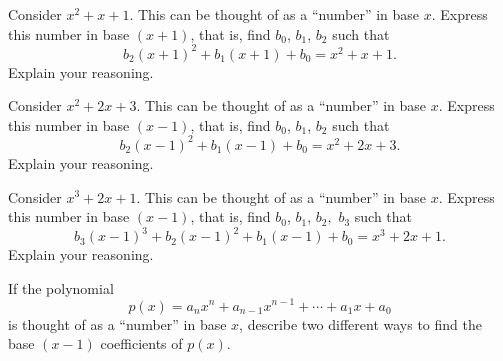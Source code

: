 \documentclass[nooutcomes]{ximera}
\begin{document}
\begin{problem}Consider $x^2 + x + 1$. This can be thought of as a ``number'' in
  base $x$. Express this number in base $(x+1)$, that is, find $b_0$, $b_1$, $b_2$ such that 
\[
b_2(x+1)^2 +b_1(x+1) + b_0 = x^2 + x + 1.
\]
Explain your reasoning.
\end{problem} 

\begin{problem}Consider $x^2 + 2x + 3$. This can be thought of as a ``number'' in
  base $x$. Express this number in base $(x-1)$, that is, find $b_0$, $b_1$, $b_2$ such that 
\[
b_2(x-1)^2 +b_1(x-1) + b_0 = x^2 + 2x + 3.
\]
Explain your reasoning.
\end{problem} 

\begin{problem}Consider $x^3 + 2x + 1$. This can be thought of as a ``number'' in
  base $x$. Express this number in base $(x-1)$, that is, find $b_0$, $b_1$, $b_2,$ $b_3$ such that 
\[
b_3(x-1)^3 + b_2(x-1)^2 +b_1(x-1) + b_0 = x^3 + 2x + 1.
\]
Explain your reasoning.
\end{problem} 

\begin{problem}If the polynomial
\[
p(x) = a_nx^n + a_{n-1}x^{n-1} + \cdots + a_1x + a_0
\]
is thought of as a ``number'' in base $x$, describe two different ways
to find the base $(x-1)$ coefficients of $p(x)$.
\end{problem}
\end{document}
